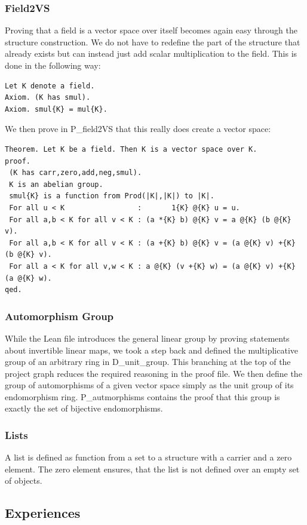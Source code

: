 \documentclass[11pt]{article}
\begin{document}
\subsubsection{Field2VS} \label{field2VS}
Proving that a field is a vector space over itself becomes again easy through the structure construction. We do not have to redefine the part of the structure that already exists but can instead just add scalar multiplication to the field. This is done in the following way:
\begin{lstlisting}
Let K denote a field.
Axiom. (K has smul).
Axiom. smul{K} = mul{K}.
\end{lstlisting}
We then prove in P\_field2VS that this really does create a vector space:
\begin{lstlisting}
Theorem. Let K be a field. Then K is a vector space over K.
proof.
 (K has carr,zero,add,neg,smul).
 K is an abelian group.
 smul{K} is a function from Prod(|K|,|K|) to |K|.
 For all u < K                 :       1{K} @{K} u = u.
 For all a,b < K for all v < K : (a *{K} b) @{K} v = a @{K} (b @{K} v).
 For all a,b < K for all v < K : (a +{K} b) @{K} v = (a @{K} v) +{K} (b @{K} v).
 For all a < K for all v,w < K : a @{K} (v +{K} w) = (a @{K} v) +{K} (a @{K} w).
qed.
\end{lstlisting}


\subsubsection{Automorphism Group}
While the Lean file introduces the general linear group by proving statements about invertible linear maps, we took a step back and defined the multiplicative group of an arbitrary ring in D\_unit\_group. This branching at the top of the project graph reduces the required reasoning in the proof file.
We then define the group of automorphisms of a given vector space simply as the unit group of its endomorphism ring. P\_autmorphisms contains the proof that this group is exactly the set of bijective endomorphisms.

\subsubsection{Lists}

A list is defined as function from a set to a structure with a carrier and a zero element. The zero element ensures, that the list is not defined over an empty set of objects.


\subsection{Experiences}
\end{document}
